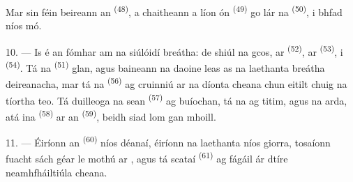 Mar sin féin beireann an  \textsuperscript{(48)}, a
chaitheann a líon ón  \textsuperscript{(49)} go lár na 
\textsuperscript{(50)}, i bhfad níos mó.

10. --- Is é an fómhar am na siúlóidí breátha: de shiúl na gcos, ar
 \textsuperscript{(52)}, ar 
\textsuperscript{(53)}, i  \textsuperscript{(54)}. Tá na
 \textsuperscript{(51)} glan, agus baineann na daoine leas as na
laethanta breátha deireanacha, mar tá na 
\textsuperscript{(56)} ag cruinniú ar na díonta cheana chun eitilt chuig na tíortha
teo. Tá duilleoga na  sean \textsuperscript{(57)} ag buíochan, tá na
 ag titim, agus na  arda, atá ina
 \textsuperscript{(58)} ar an 
\textsuperscript{(59)}, beidh siad lom gan mhoill.

11. --- Éiríonn an  \textsuperscript{(60)} níos déanaí, éiríonn na
laethanta níos giorra, tosaíonn fuacht sách géar le mothú ar , agus
tá scataí  \textsuperscript{(61)} ag fágáil ár dtíre
neamhfháiltiúla cheana.
\VUsaut{6.0mm}
\VUfilet{22mm}
